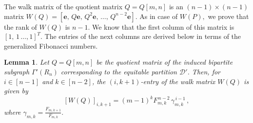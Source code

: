 \documentclass[11pt,oneside]{article}
\theoremstyle{plain}
\theoremstyle{plain}
\newtheorem{lem}[theorem]{Lemma}
\theoremstyle{definition}
\numberwithin{figure}{section}
\theoremstyle{remark}
\numberwithin{equation}{section}
\begin{document}
		
		The walk matrix of the quotient matrix $Q = Q[m,n]$ is an $(n-1)\times (n-1)$ matrix $W(Q) = [\mathbf e,\, Q\mathbf e,\, Q^2\mathbf e,\, \dots,\, Q^{n-2}\mathbf e]$. As in case of $W(P),$ we prove that the rank of $W(Q)$ is $n-1.$   We know that the first column of this matrix is $[1,\, 1\, \dots, 1]^T.$ The entries of the next columns are derived below in terms of the generalized Fibonacci numbers.
		
		\begin{lem}\label{lem: entry of WQ}
			Let $Q = Q[m,n]$ be the quotient matrix of the induced bipartite subgraph $\Gamma'(R_n)$ corresponding to the equitable partition $\mathcal{D'}$. Then, for $i \in [n-1]$ and $k \in [n-2]$, the $(i,k+1)$-entry of the walk matrix  $W(Q)$ is given by 
			\[
			[W(Q)]_{i,k+1}= (m-1)^k F_{m,k}^{\,n-2} \, \gamma_{m,k}^{\,i-1}\,,
			\]
			where  $\displaystyle{\gamma_{m,k} = \frac{F_{m,k+1}}{F_{m,k}}}.$
		\end{lem}
		
\end{document}
